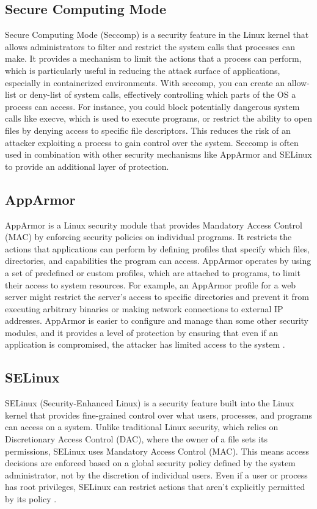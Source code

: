\documentclass[12pt]{report}
\begin{document}
\begin{doublespace}
\subsection{Secure Computing Mode}
Secure Computing Mode (Seccomp) is a security feature in the Linux kernel that allows administrators to filter and restrict the system calls that processes can make. It provides a mechanism to limit the actions that a process can perform, which is particularly useful in reducing the attack surface of applications, especially in containerized environments. With seccomp, you can create an allow-list or deny-list of system calls, effectively controlling which parts of the OS a process can access. For instance, you could block potentially dangerous system calls like execve, which is used to execute programs, or restrict the ability to open files by denying access to specific file descriptors. This reduces the risk of an attacker exploiting a process to gain control over the system. Seccomp is often used in combination with other security mechanisms like AppArmor and SELinux to provide an additional layer of protection.

\subsection{AppArmor}
AppArmor is a Linux security module that provides Mandatory Access Control (MAC) by enforcing security policies on individual programs. It restricts the actions that applications can perform by defining profiles that specify which files, directories, and capabilities the program can access. AppArmor operates by using a set of predefined or custom profiles, which are attached to programs, to limit their access to system resources. For example, an AppArmor profile for a web server might restrict the server's access to specific directories and prevent it from executing arbitrary binaries or making network connections to external IP addresses. AppArmor is easier to configure and manage than some other security modules, and it provides a level of protection by ensuring that even if an application is compromised, the attacker has limited access to the system \cite{archwiki_apparmor}.

\subsection{SELinux}
SELinux (Security-Enhanced Linux) is a security feature built into the Linux kernel that provides fine-grained control over what users, processes, and programs can access on a system. Unlike traditional Linux security, which relies on Discretionary Access Control (DAC), where the owner of a file sets its permissions, SELinux uses Mandatory Access Control (MAC). This means access decisions are enforced based on a global security policy defined by the system administrator, not by the discretion of individual users. Even if a user or process has root privileges, SELinux can restrict actions that aren't explicitly permitted by its policy \cite{redhat2007selinuxguide}.


\end{doublespace}
\end{document}
